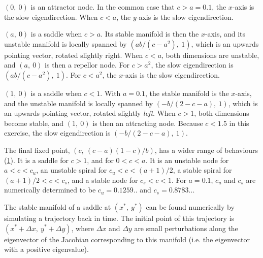 $(0,\ 0)$ is an attractor node. In the common case that $c > a = 0.1$, the $x$-axis is the slow eigendirection. When $c < a$, the $y$-axis is the slow eigendirection.

$(a,\ 0)$ is a saddle when $c > a$. Its stable manifold is then the $x$-axis, and its unstable manifold is locally spanned by $(ab/(c-a^2),\ 1)$, which is an upwards pointing vector, rotated slightly right. When $c < a$, both dimensions are unstable, and $(a,\ 0)$ is then a repellor node. For $c > a^2$, the slow eigendirection is $(ab/(c-a^2),\ 1)$. For $c < a^2$, the $x$-axis is the slow eigendirection.

$(1,\ 0)$ is a saddle when $c < 1$. With $a = 0.1$, the stable manifold is the $x$-axis, and the unstable manifold is locally spanned by $(-b/(2-c-a),\ 1)$, which is an upwards pointing vector, rotated slightly \emph{left}. When $c > 1$, both dimensions become stable, and $(1,\ 0)$ is then an attracting node. Because $c < 1.5$ in this exercise, the slow eigendirection is $(-b/(2-c-a),\ 1)$.

The final fixed point, $(c,\ (c-a)(1-c)/b)$, has a wider range of behaviours (\cref{fig:eigenheart}). It is a saddle for $c > 1$, and for $0 < c < a$. It is an unstable node for $a < c < c_u$, an unstable spiral for $c_u < c < (a+1)/2$, a stable spiral for $(a+1)/2 < c < c_s$, and a stable node for $c_s < c < 1$. For $a = 0.1$, $c_u$ and $c_s$ are numerically determined to be $c_u = 0.1259..$ and $c_s = 0.8783..$.

\begin{figure}
\label{fig:eigenheart}
\end{figure}


The stable manifold of a saddle at $(x^*,\ y^*)$ can be found numerically by simulating a trajectory back in time. The initial point of this trajectory is $(x^* + \Delta x,\ y^* + \Delta y)$, where $\Delta x$ and $\Delta y$ are small perturbations along the eigenvector of the Jacobian corresponding to this manifold (i.e. the eigenvector with a positive eigenvalue).

